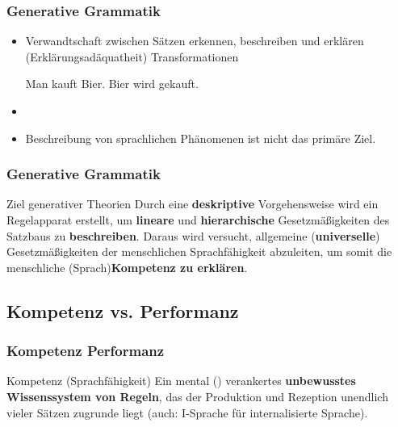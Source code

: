 \begin{frame}
\frametitle{Generative Grammatik}

\begin{itemize}
	\item Verwandtschaft zwischen Sätzen erkennen, beschreiben und erklären (Erklärungsadäquatheit) \ras Transformationen
	
	\eal 
	\ex Man kauft Bier.
	\ex Bier wird gekauft.
	\zl
	
	\item[]	
	\item Beschreibung von sprachlichen Phänomenen ist nicht das primäre Ziel.
\end{itemize}

\end{frame}


\begin{frame}
\frametitle{Generative Grammatik}

\begin{block}{Ziel generativer Theorien}
Durch eine \textbf{deskriptive} Vorgehensweise wird ein Regelapparat erstellt, um \textbf{lineare} und \textbf{hierarchische} Gesetzmäßigkeiten des Satzbaus zu \textbf{beschreiben}. Daraus wird versucht, allgemeine (\textbf{universelle}) Gesetzmäßigkeiten der menschlichen Sprachfähigkeit abzuleiten, um somit die menschliche (Sprach)\textbf{Kompetenz zu erklären}.
\end{block}

\end{frame}


\subsection{Kompetenz vs. Performanz}


\begin{frame}
\frametitle{Kompetenz \vs Performanz}

\begin{block}{Kompetenz (Sprachfähigkeit)}
Ein mental () verankertes \textbf{unbewusstes Wissenssystem von Regeln}, das der Produktion und Rezeption unendlich vieler Sätzen zugrunde liegt (auch: I-Sprache für internalisierte Sprache). \citep[vgl.][]{Fries&MyP16d}
\end{block}	


\end{frame}


